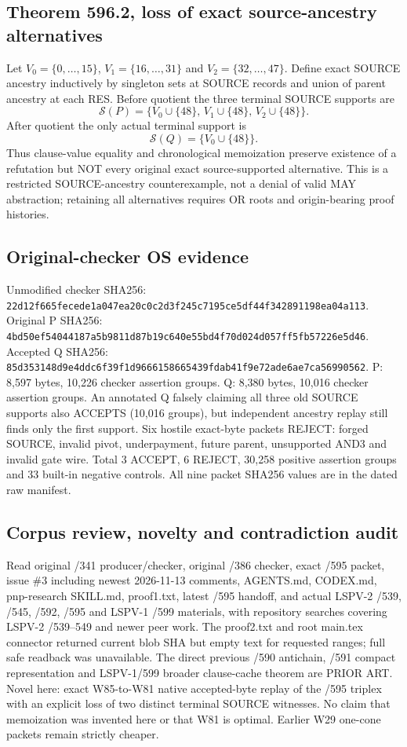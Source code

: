 \documentclass[11pt]{article}
\begin{document}
\subsection*{Theorem 596.2, loss of exact source-ancestry alternatives}
Let $V_0=\{0,\dots,15\}$, $V_1=\{16,\dots,31\}$ and $V_2=\{32,\dots,47\}$. Define exact SOURCE ancestry inductively by singleton sets at SOURCE records and union of parent ancestry at each RES. Before quotient the three terminal SOURCE supports are
\[
\mathcal S(P)=\{V_0\cup\{48\},\,V_1\cup\{48\},\,V_2\cup\{48\}\}.
\]
After quotient the only actual terminal support is
\[
\mathcal S(Q)=\{V_0\cup\{48\}\}.
\]
Thus clause-value equality and chronological memoization preserve existence of a refutation but NOT every original exact source-supported alternative. This is a restricted SOURCE-ancestry counterexample, not a denial of valid MAY abstraction; retaining all alternatives requires OR roots and origin-bearing proof histories.

\subsection*{Original-checker OS evidence}
Unmodified checker SHA256:
\texttt{22d12f665fecede1a047ea20c0c2d3f245c7195ce5df44f342891198ea04a113}.
Original P SHA256:
\texttt{4bd50ef54044187a5b9811d87b19c640e55bd4f70d024d057ff5fb57226e5d46}.
Accepted Q SHA256:
\texttt{85d353148d9e4ddc6f39f1d9666158665439fdab41f9e72ade6ae7ca56990562}.
P: 8,597 bytes, 10,226 checker assertion groups.
Q: 8,380 bytes, 10,016 checker assertion groups.
An annotated Q falsely claiming all three old SOURCE supports also ACCEPTS (10,016 groups), but independent ancestry replay still finds only the first support. Six hostile exact-byte packets REJECT: forged SOURCE, invalid pivot, underpayment, future parent, unsupported AND3 and invalid gate wire. Total 3 ACCEPT, 6 REJECT, 30,258 positive assertion groups and 33 built-in negative controls. All nine packet SHA256 values are in the dated raw manifest.

\subsection*{Corpus review, novelty and contradiction audit}
Read original /341 producer/checker, original /386 checker, exact /595 packet, issue \#3 including newest 2026-11-13 comments, AGENTS.md, CODEX.md, pnp-research SKILL.md, proof1.txt, latest /595 handoff, and actual LSPV-2 /539, /545, /592, /595 and LSPV-1 /599 materials, with repository searches covering LSPV-2 /539--549 and newer peer work. The proof2.txt and root main.tex connector returned current blob SHA but empty text for requested ranges; full safe readback was unavailable. The direct previous /590 antichain, /591 compact representation and LSPV-1/599 broader clause-cache theorem are PRIOR ART. Novel here: exact W85-to-W81 native accepted-byte replay of the /595 triplex with an explicit loss of two distinct terminal SOURCE witnesses. No claim that memoization was invented here or that W81 is optimal. Earlier W29 one-cone packets remain strictly cheaper.
\end{document}
